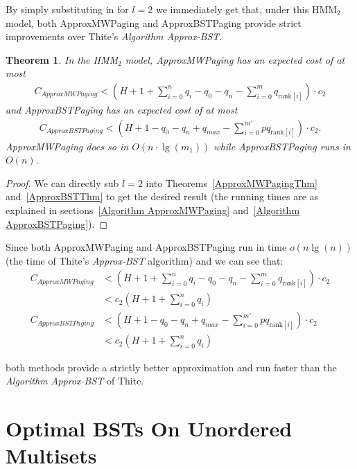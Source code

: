 \documentclass[]{beamer}
\theoremstyle{plain}
\newtheorem{thm}{Theorem}[section]
\begin{document}
\begin{frame}
By simply substituting in for $l=2$ we immediately get that, under this HMM$_2$ model, both ApproxMWPaging and ApproxBSTPaging provide strict improvements over Thite's \textit{Algorithm Approx-BST}. 

\begin{thm}
In the HMM$_2$ model, ApproxMWPaging has an expected cost of at most \\
\begin{align*}
C_{ApproxMWPaging} < (H + 1 + \sum_{i=0}^n q_i - q_0 - q_n - \sum_{i=0}^m q_{\text{rank}[i]}) \cdot  c_2
\end{align*}
and ApproxBSTPaging has an expected cost of at most
\begin{align*}
C_{ApproxBSTPaging} <  (H + 1 - q_0 - q_n + q_{max} - \sum_{i=0}^{m'} pq_{\text{rank}[i]})\cdot c_2.
\end{align*}
ApproxMWPaging does so in $O(n\cdot \lg(m_1))$ while ApproxBSTPaging runs in $O(n)$.
\end{thm}

\begin{proof}
We can directly sub $l=2$ into Theorems~\ref{ApproxMWPagingThm} and~\ref{ApproxBSTThm} to get the desired result (the running times are as explained in sections~\ref{Algorithm ApproxMWPaging} and~\ref{Algorithm ApproxBSTPaging}).
\end{proof}

Since both ApproxMWPaging and ApproxBSTPaging run in time $o(n\lg(n))$ (the time of Thite's \textit{Approx-BST} algorithm) and we can see that:\\
\begin{align*}
C_{ApproxMWPaging} &< (H + 1 + \sum_{i=0}^n q_i - q_0 - q_n - \sum_{i=0}^m q_{\text{rank}[i]}) \cdot  c_2 \\
&< c_2(H+1+\sum_{i=0}^{n}q_i) \\
 C_{ApproxBSTPaging} &< (H + 1 - q_0 - q_n + q_{max} - \sum_{i=0}^{m'} pq_{\text{rank}[i]})\cdot c_2 \\
 &< c_2(H+1+\sum_{i=0}^{n}q_i)
 \end{align*}

both methods provide a strictly better approximation and run faster than the \textit{Algorithm Approx-BST} of Thite.
\end{frame}


\section{Optimal BSTs On Unordered Multisets}\label{BST over Multisets}
\end{document}
